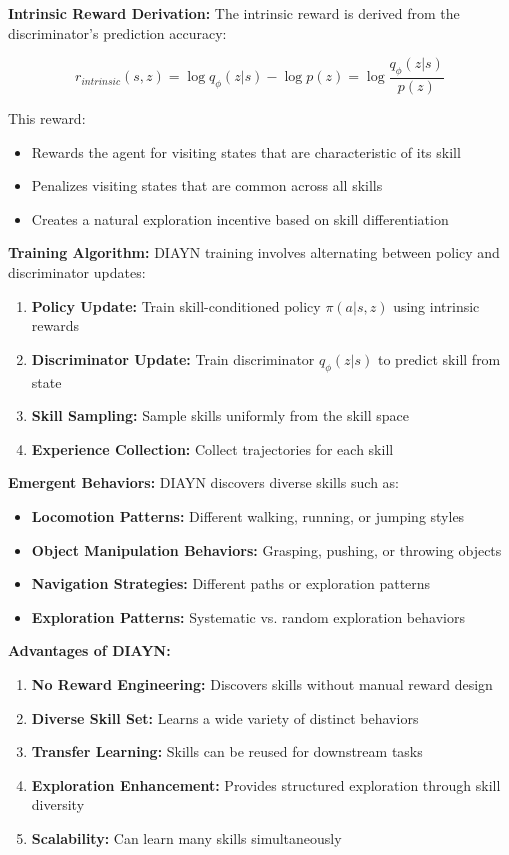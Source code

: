 \documentclass[12pt]{article}
\begin{document}
{{\textbf{Intrinsic Reward Derivation:}
The intrinsic reward is derived from the discriminator's prediction accuracy:

\[
r_{intrinsic}(s,z) = \log q_\phi(z|s) - \log p(z) = \log \frac{q_\phi(z|s)}{p(z)}
\]

This reward:
\begin{itemize}
    \item Rewards the agent for visiting states that are characteristic of its skill
    \item Penalizes visiting states that are common across all skills
    \item Creates a natural exploration incentive based on skill differentiation
\end{itemize}

\textbf{Training Algorithm:}
DIAYN training involves alternating between policy and discriminator updates:

\begin{enumerate}
    \item \textbf{Policy Update:} Train skill-conditioned policy $\pi(a|s,z)$ using intrinsic rewards
    \item \textbf{Discriminator Update:} Train discriminator $q_\phi(z|s)$ to predict skill from state
    \item \textbf{Skill Sampling:} Sample skills uniformly from the skill space
    \item \textbf{Experience Collection:} Collect trajectories for each skill
\end{enumerate}

\textbf{Emergent Behaviors:}
DIAYN discovers diverse skills such as:
\begin{itemize}
    \item \textbf{Locomotion Patterns:} Different walking, running, or jumping styles
    \item \textbf{Object Manipulation Behaviors:} Grasping, pushing, or throwing objects
    \item \textbf{Navigation Strategies:} Different paths or exploration patterns
    \item \textbf{Exploration Patterns:} Systematic vs. random exploration behaviors
\end{itemize}

\textbf{Advantages of DIAYN:}
    \begin{enumerate}
    \item \textbf{No Reward Engineering:} Discovers skills without manual reward design
    \item \textbf{Diverse Skill Set:} Learns a wide variety of distinct behaviors
    \item \textbf{Transfer Learning:} Skills can be reused for downstream tasks
    \item \textbf{Exploration Enhancement:} Provides structured exploration through skill diversity
    \item \textbf{Scalability:} Can learn many skills simultaneously
\end{enumerate}

}}
\end{document}
